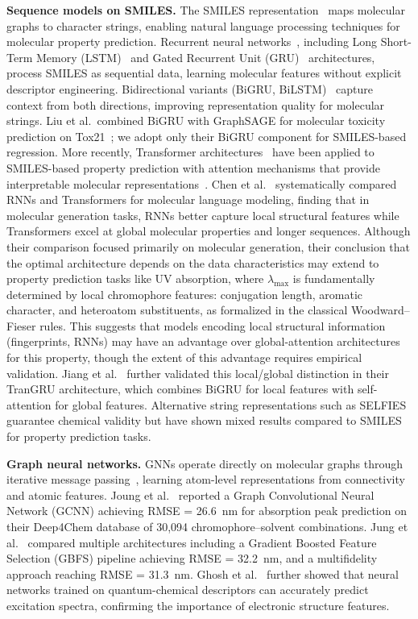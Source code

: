 \documentclass[11pt,a4paper]{article}
\begin{document}
\textbf{Sequence models on SMILES.}
The SMILES representation~\cite{weininger1988smiles} maps molecular graphs to character strings, enabling natural language processing techniques for molecular property prediction.
Recurrent neural networks~\cite{elman1990finding}, including Long Short-Term Memory (LSTM)~\cite{hochreiter1997long} and Gated Recurrent Unit (GRU)~\cite{cho2014learning} architectures, process SMILES as sequential data, learning molecular features without explicit descriptor engineering.
Bidirectional variants (BiGRU, BiLSTM)~\cite{schuster1997bidirectional} capture context from both directions, improving representation quality for molecular strings.
Liu et al.\ combined BiGRU with GraphSAGE for molecular toxicity prediction on Tox21~\cite{liuPredictionMolecularToxicity2023}; we adopt only their BiGRU component for SMILES-based regression.
More recently, Transformer architectures~\cite{vaswani2017attention} have been applied to SMILES-based property prediction with attention mechanisms that provide interpretable molecular representations~\cite{hondaSMILESTransformerPretrained2019}.
Chen et al.~\cite{chenMolecularLanguage2023} systematically compared RNNs and Transformers for molecular language modeling, finding that in molecular generation tasks, RNNs better capture local structural features while Transformers excel at global molecular properties and longer sequences.
Although their comparison focused primarily on molecular generation, their conclusion that the optimal architecture depends on the data characteristics may extend to property prediction tasks like UV absorption, where $\lambda_{\max}$ is fundamentally determined by local chromophore features: conjugation length, aromatic character, and heteroatom substituents, as formalized in the classical Woodward--Fieser rules.
This suggests that models encoding local structural information (fingerprints, RNNs) may have an advantage over global-attention architectures for this property, though the extent of this advantage requires empirical validation.
Jiang et al.~\cite{jiang2023trangru} further validated this local/global distinction in their TranGRU architecture, which combines BiGRU for local features with self-attention for global features.
Alternative string representations such as SELFIES~\cite{krenn2020selfies} guarantee chemical validity but have shown mixed results compared to SMILES for property prediction tasks.

\textbf{Graph neural networks.}
GNNs operate directly on molecular graphs through iterative message passing~\cite{gilmer2017neural}, learning atom-level representations from connectivity and atomic features.
Joung et al.~\cite{joung2021deep} reported a Graph Convolutional Neural Network (GCNN) achieving RMSE = 26.6~nm for absorption peak prediction on their Deep4Chem database of 30,094 chromophore--solvent combinations.
Jung et al.~\cite{jung2024machine} compared multiple architectures including a Gradient Boosted Feature Selection (GBFS) pipeline achieving RMSE = 32.2~nm, and a multifidelity approach reaching RMSE = 31.3~nm.
Ghosh et al.~\cite{ghosh2019deep} further showed that neural networks trained on quantum-chemical descriptors can accurately predict excitation spectra, confirming the importance of electronic structure features.
\end{document}

